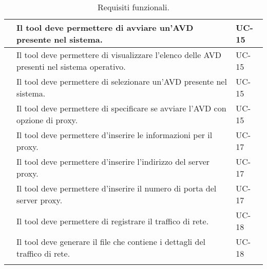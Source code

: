\begin{longtable}{ | c| C{7cm} |C{3cm} |}
           & Il tool deve permettere di avviare un'AVD presente nel sistema.                                                       & UC-15          \\\hline
        & Il tool deve permettere di visualizzare l'elenco delle AVD presenti nel sistema operativo.                            & UC-15          \\\hline
        & Il tool deve permettere di selezionare un'AVD presente nel sistema.                                                   & UC-15          \\\hline
        & Il tool deve permettere di specificare se avviare l'AVD con opzione di proxy.                                         & UC-15          \\\hline
    \setcounter{subCount}{0}
           & Il tool deve permettere d'inserire le informazioni per il proxy.                                                      & UC-17          \\\hline
        & Il tool deve permettere d'inserire l'indirizzo del server proxy.                                                      & UC-17          \\\hline
        & Il tool deve permettere d'inserire il numero di porta del server proxy.                                               & UC-17          \\\hline
    \setcounter{subCount}{0}
           & Il tool deve permettere di registrare il traffico di rete.                                                            & UC-18          \\\hline
        & Il tool deve generare il file che contiene i dettagli del traffico di rete.                                           & UC-18          \\\hline
    \caption{Requisiti funzionali.}
\end{longtable}

\setcounter{rowcount}{0}

